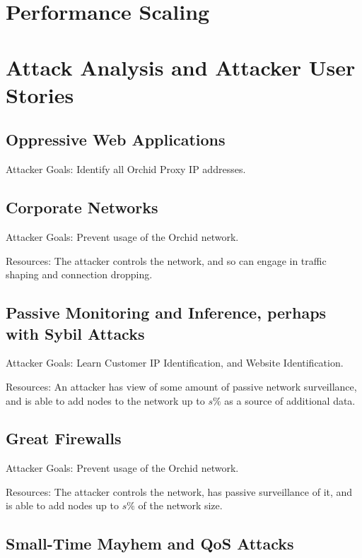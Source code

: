 \documentclass{article}
\newcommand{\mesh}{Orchid}
\newcommand{\Mesh}{\mesh}
\begin{document}
\section{Performance Scaling}
\label{sec:performance}


\section{Attack Analysis and Attacker User Stories}
\label{sec:attack-stories}

\subsection{Oppressive Web Applications}

Attacker Goals: Identify all \Mesh{} Proxy IP addresses.

\subsection{Corporate Networks}

Attacker Goals: Prevent usage of the \Mesh{} network.

Resources: The attacker controls the network, and so can engage in traffic shaping and connection dropping.

\subsection{Passive Monitoring and Inference, perhaps with Sybil Attacks}

Attacker Goals: Learn Customer IP Identification, and Website Identification.

Resources: An attacker has view of some amount of passive network surveillance, and is able to add nodes to the network up to $s\%$ as a source of additional data.

\subsection{Great Firewalls}

Attacker Goals: Prevent usage of the \Mesh{} network.

Resources: The attacker controls the network, has passive surveillance of it, and is able to add nodes up to $s\%$ of the network size.

\subsection{Small-Time Mayhem and QoS Attacks}
\end{document}
